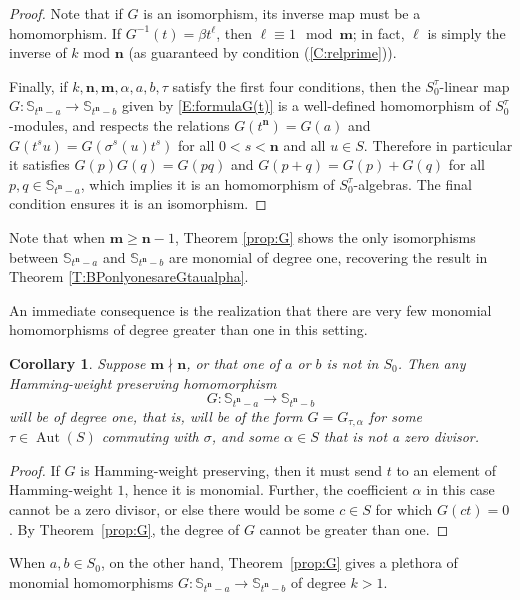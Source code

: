 \documentclass[11pt]{amsart}
\theoremstyle{plain}
\newtheorem{corollary}[theorem]{Corollary}
\theoremstyle{definition}
\numberwithin{equation}{section}
\numberwithin{figure}{section}
\newcommand{\Sone}[1]{\Stsigma/\Stsigma (t^{\de}-#1)} %
\newcommand{\Sonenew}[1]{\mathbb{S}_{t^\de-#1}}
\newcommand{\ring}{S}
\newcommand{\Stsigma}{S[t;\sigma]}
\newcommand{\os}{\mathbf{m}}  %
\newcommand{\de}{\mathbf{n}}  %
\DeclareMathOperator{\Aut}{Aut}
\begin{document}
\begin{proof}
Note that if $G$ is an isomorphism, its inverse map must be a homomorphism.  If $G^{-1}(t)=\beta t^\ell$, then $\ell \equiv 1 \mod \os$; in fact, $\ell$ is simply the inverse of $k$ mod $\de$ (as guaranteed by condition (\ref{C:relprime})).

Finally, if $k,\de,\os,\alpha,a,b,\tau$ satisfy the first four conditions, then the $\ring_0^\tau$-linear map $G:\mathbb{S}_{t^\de -a}\to \mathbb{S}_{t^\de -b}$
given by \eqref{E:formulaG(t)} is a well-defined homomorphism of $\ring_0^\tau$-modules, and respects the relations $G(t^{\de})=G(a)$ and $G(t^su)=G(\sigma^s(u)t^s)$ for all $0<s<\de$ and all $u\in \ring$.  Therefore in particular it satisfies $G(p)G(q)=G(pq)$ and $G(p+q)=G(p)+G(q)$ for all $p,q\in \Sonenew{a}$, which implies it is an homomorphism of $\ring_0^\tau$-algebras.  The final condition ensures it is an isomorphism.
\end{proof}

Note that when $\os\geq \de -1$, Theorem \ref{prop:G} shows the only isomorphisms between $\mathbb{S}_{t^\de -a}$ and $\mathbb{S}_{t^\de -b}$
are monomial of degree one, recovering the result in Theorem \ref{T:BPonlyonesareGtaualpha}.

An immediate consequence is the realization that there are very few monomial homomorphisms of degree greater than one in this setting.

\begin{corollary}\label{C:onlyweightone}
    Suppose $\os\nmid \de$, or that one of $a$ or $b$ is not in $\ring_0$.  Then  any Hamming-weight preserving homomorphism
    $$
    G : \mathbb{S}_{t^\de -a}\to \mathbb{S}_{t^\de -b} 
    $$
    will be of degree one, that is, will be of the form $G=G_{\tau,\alpha}$ for some $\tau\in \Aut(S)$ commuting with $\sigma$, and some $\alpha \in \ring$ that is not a zero divisor.
\end{corollary}

\begin{proof}
    If $G$ is Hamming-weight preserving, then it must send $t$ to an element of Hamming-weight $1$, hence it is monomial.  Further, the coefficient $\alpha$ in this case cannot be a zero divisor, or else there would be some $c\in \ring$ for which $G(ct)=0$.      By Theorem~\ref{prop:G}, the degree of $G$ cannot be greater than one.
\end{proof}


When $a,b\in \ring_0$, on the other hand, Theorem~\ref{prop:G} gives a plethora of monomial homomorphisms $G:\mathbb{S}_{t^\de -a}\to \mathbb{S}_{t^\de -b}$ 
of degree $k>1$.
\end{document}
